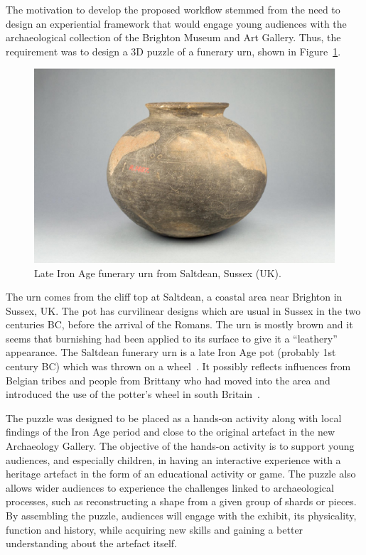 \documentclass[acmlarge,screen,dvipsnames]{acmart}
\begin{document}
The motivation to develop the proposed workflow stemmed from the need
to design an experiential framework that would engage young audiences
with the archaeological collection of the Brighton Museum and Art
Gallery. Thus, the requirement was to design a 3D puzzle of a funerary
urn, shown in Figure~\ref{fig:pot}.%
%
\begin{figure}[b]
  \centering
  \includegraphics[width=0.6\linewidth]{images/pot}
  \caption{\label{fig:pot}
    Late Iron Age funerary urn from Saltdean, Sussex (UK).}
\end{figure}
%
The urn comes from the cliff top at Saltdean, a coastal area near
Brighton in Sussex, UK. The pot has curvilinear designs which are
usual in Sussex in the two centuries BC, before the arrival of the
Romans. The urn is mostly brown and it seems that burnishing had been
applied to its surface to give it a ``leathery'' appearance. The
Saltdean funerary urn is a late Iron Age pot (probably 1st century BC)
which was thrown on a wheel~\cite{Toms1912}. It possibly reflects
influences from Belgian tribes and people from Brittany who had moved
into the area and introduced the use of the potter's wheel in south
Britain~\cite{Harding1974,Cunliffe1978,Adkins1982,Cunliffe1995}.

The puzzle was designed to be placed as a hands-on activity along with
local findings of the Iron Age period and close to the original
artefact in the new Archaeology Gallery. The objective of the hands-on
activity is to support young audiences, and especially children, in
having an interactive experience with a heritage artefact in the form
of an educational activity or game. The puzzle also allows wider
audiences to experience the challenges linked to archaeological
processes, such as reconstructing a shape from a given group of shards
or pieces. By assembling the puzzle, audiences will engage with the
exhibit, its physicality, function and history, while acquiring new
skills and gaining a better understanding about the artefact itself.
\end{document}

